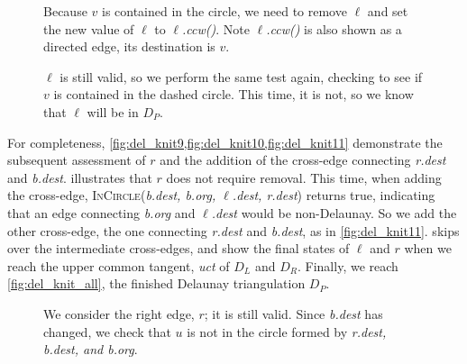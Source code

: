 \documentclass[12pt,twoside]{reedthesis}
\begin{document}
      \begin{figure}[H]
        \ContinuedFloat
        \centering
        \begin{subtable}{\textwidth}
          \centering
          
          \caption{Because $v$ is contained in the circle, we need to remove $\ell$ and set the new value of $\ell$ to \textit{$\ell$.ccw()}. Note \textit{$\ell$.ccw()} is also shown as a directed edge, its destination is $v$.}
          \label{fig:del_knit7}
        \end{subtable}
      \end{figure}

      \begin{figure}[H]
        \ContinuedFloat
        \centering
        \begin{subtable}{\textwidth}
          \centering
          
          \caption{$\ell$ is still valid, so we perform the same test again, checking to see if $v$ is contained in the dashed circle. This time, it is not, so we know that $\ell$ will be in $D_{P}$.}
          \label{fig:del_knit8}
        \end{subtable}
      \end{figure}

      For completeness, \cref{fig:del_knit9,fig:del_knit10,fig:del_knit11} demonstrate the subsequent assessment of $r$ and the addition of the cross-edge connecting \textit{r.dest} and \textit{b.dest}.  illustrates that $r$ does not require removal. This time, when adding the cross-edge, \textsc{InCircle}(\textit{b.dest, b.org, $\ell$.dest, r.dest}) returns true, indicating that an edge connecting \textit{b.org} and \textit{$\ell$.dest} would be non-Delaunay. So we add the other cross-edge, the one connecting \textit{r.dest} and \textit{b.dest}, as in \cref{fig:del_knit11}.  skips over the intermediate cross-edges, and show the final states of $\ell$ and $r$ when we reach the upper common tangent, \textit{uct} of $D_{L}$ and $D_{R}$. Finally, we reach \cref{fig:del_knit_all}, the finished Delaunay triangulation $D_{P}$.

      \begin{figure}[!htb]
        \ContinuedFloat
        \centering
        \begin{subtable}{\textwidth}
          \centering
          
          \caption{We consider the right edge, $r$; it is still valid. Since \textit{b.dest} has changed, we check that $u$ is not in the circle formed by \textit{r.dest, b.dest, and b.org}.}
          \label{fig:del_knit9}
        \end{subtable}
      \end{figure}
\end{document}
